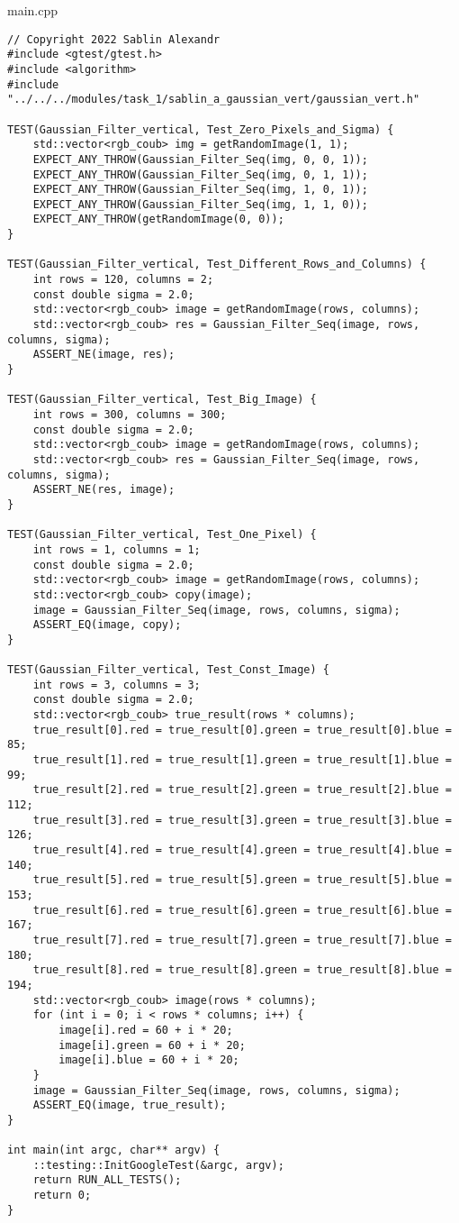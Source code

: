 \documentclass{report}
\begin{document}
main.cpp
\begin{lstlisting}
// Copyright 2022 Sablin Alexandr
#include <gtest/gtest.h>
#include <algorithm>
#include "../../../modules/task_1/sablin_a_gaussian_vert/gaussian_vert.h"

TEST(Gaussian_Filter_vertical, Test_Zero_Pixels_and_Sigma) {
    std::vector<rgb_coub> img = getRandomImage(1, 1);
    EXPECT_ANY_THROW(Gaussian_Filter_Seq(img, 0, 0, 1));
    EXPECT_ANY_THROW(Gaussian_Filter_Seq(img, 0, 1, 1));
    EXPECT_ANY_THROW(Gaussian_Filter_Seq(img, 1, 0, 1));
    EXPECT_ANY_THROW(Gaussian_Filter_Seq(img, 1, 1, 0));
    EXPECT_ANY_THROW(getRandomImage(0, 0));
}

TEST(Gaussian_Filter_vertical, Test_Different_Rows_and_Columns) {
    int rows = 120, columns = 2;
    const double sigma = 2.0;
    std::vector<rgb_coub> image = getRandomImage(rows, columns);
    std::vector<rgb_coub> res = Gaussian_Filter_Seq(image, rows, columns, sigma);
    ASSERT_NE(image, res);
}

TEST(Gaussian_Filter_vertical, Test_Big_Image) {
    int rows = 300, columns = 300;
    const double sigma = 2.0;
    std::vector<rgb_coub> image = getRandomImage(rows, columns);
    std::vector<rgb_coub> res = Gaussian_Filter_Seq(image, rows, columns, sigma);
    ASSERT_NE(res, image);
}

TEST(Gaussian_Filter_vertical, Test_One_Pixel) {
    int rows = 1, columns = 1;
    const double sigma = 2.0;
    std::vector<rgb_coub> image = getRandomImage(rows, columns);
    std::vector<rgb_coub> copy(image);
    image = Gaussian_Filter_Seq(image, rows, columns, sigma);
    ASSERT_EQ(image, copy);
}

TEST(Gaussian_Filter_vertical, Test_Const_Image) {
    int rows = 3, columns = 3;
    const double sigma = 2.0;
    std::vector<rgb_coub> true_result(rows * columns);
    true_result[0].red = true_result[0].green = true_result[0].blue = 85;
    true_result[1].red = true_result[1].green = true_result[1].blue = 99;
    true_result[2].red = true_result[2].green = true_result[2].blue = 112;
    true_result[3].red = true_result[3].green = true_result[3].blue = 126;
    true_result[4].red = true_result[4].green = true_result[4].blue = 140;
    true_result[5].red = true_result[5].green = true_result[5].blue = 153;
    true_result[6].red = true_result[6].green = true_result[6].blue = 167;
    true_result[7].red = true_result[7].green = true_result[7].blue = 180;
    true_result[8].red = true_result[8].green = true_result[8].blue = 194;
    std::vector<rgb_coub> image(rows * columns);
    for (int i = 0; i < rows * columns; i++) {
        image[i].red = 60 + i * 20;
        image[i].green = 60 + i * 20;
        image[i].blue = 60 + i * 20;
    }
    image = Gaussian_Filter_Seq(image, rows, columns, sigma);
    ASSERT_EQ(image, true_result);
}

int main(int argc, char** argv) {
    ::testing::InitGoogleTest(&argc, argv);
    return RUN_ALL_TESTS();
    return 0;
}
\end{lstlisting}
\end{document}
